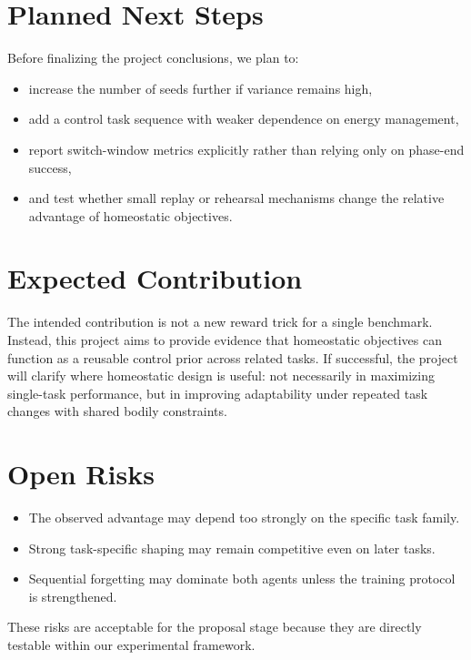 \documentclass[11pt]{article}
\begin{document}
\section{Planned Next Steps}
Before finalizing the project conclusions, we plan to:
\begin{itemize}[leftmargin=1.5em]
    \item increase the number of seeds further if variance remains high,
    \item add a control task sequence with weaker dependence on energy management,
    \item report switch-window metrics explicitly rather than relying only on phase-end success,
    \item and test whether small replay or rehearsal mechanisms change the relative advantage of homeostatic objectives.
\end{itemize}

\section{Expected Contribution}
The intended contribution is not a new reward trick for a single benchmark. Instead, this project aims to provide evidence that homeostatic objectives can function as a reusable control prior across related tasks. If successful, the project will clarify where homeostatic design is useful: not necessarily in maximizing single-task performance, but in improving adaptability under repeated task changes with shared bodily constraints.

\section{Open Risks}
\begin{itemize}[leftmargin=1.5em]
    \item The observed advantage may depend too strongly on the specific task family.
    \item Strong task-specific shaping may remain competitive even on later tasks.
    \item Sequential forgetting may dominate both agents unless the training protocol is strengthened.
\end{itemize}

These risks are acceptable for the proposal stage because they are directly testable within our experimental framework.
\end{document}
